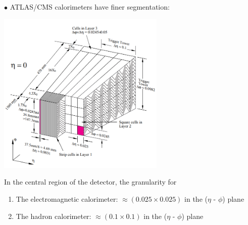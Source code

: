 \documentclass[9pt,a4paper,unknownkeysallowed,xcolor=dvipsnames,aspectratio=43]{beamer}
\begin{document}
\begin{frame}\vspace{2mm}

{\color{darkred}\Large$\bullet$} ATLAS/CMS calorimeters have {\color{darkred}finer segmentation}:

\begin{center}
\includegraphics[width=0.6\textwidth]{01/granularity.png}
\end{center}

In the central region of the detector, the granularity for
\begin{enumerate}
    \item[\diamondsuit] {\color{red} The electromagnetic calorimeter:} $\approx(0.025\times 0.025)$ in the ($\eta$ - $\phi$) plane
    \item[\diamondsuit] {\color{red} The hadron calorimeter:} $\approx(0.1\times 0.1)$ in the ($\eta$ - $\phi$) plane
\end{enumerate}
\end{frame}
\end{document}
